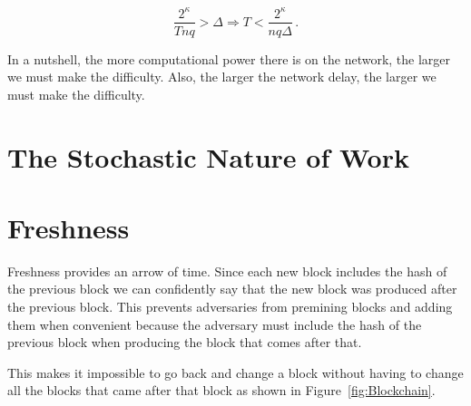 \[
  \frac{2^\kappa}{Tnq} > \Delta \Rightarrow T < \frac{2^\kappa}{nq\Delta}\,.
\]

In a nutshell, the more computational power there is on the network, the larger we must make the difficulty.
Also, the larger the network delay, the larger we must make the difficulty.

\section{The Stochastic Nature of Work}

\section{Freshness}
Freshness provides an arrow of time. Since each new block includes the hash of the previous block we can confidently say that the new block was produced after the previous block. This prevents adversaries from premining blocks and adding them when convenient because the adversary must include the hash of the previous block when producing the block that comes after that.

This makes it impossible to go back and change a block without having to change all the blocks that came after that block as shown in Figure~\ref{fig:Blockchain}.

